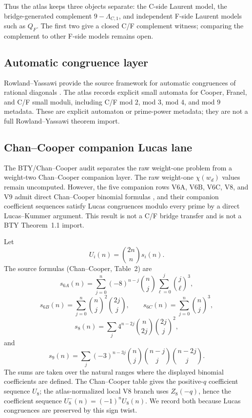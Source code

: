 \documentclass[11pt,a4paper]{article}
\begin{document}
Thus the atlas keeps three objects separate: the C-side Laurent model, the
bridge-generated complement $9-\Lambda_{C,1}$, and independent F-side Laurent
models such as $Q_F$.  The first two give a closed C/F complement
witness; comparing the complement to other F-side models remains open.

\subsection{Automatic congruence layer}

Rowland--Yassawi provide the source framework for automatic congruences of
rational diagonals \cite{rowland_yassawi_2015_automatic_congruences}.  The
atlas records explicit small automata for Cooper, Franel, and C/F small
moduli, including C/F mod $2$, mod $3$, mod $4$, and mod $9$ metadata.  These
are explicit automaton or prime-power metadata; they are not a full
Rowland--Yassawi theorem import.

\subsection{Chan--Cooper companion Lucas lane}

The BTY/Chan--Cooper audit separates the raw weight-one problem from a
weight-two Chan--Cooper companion layer.  The raw weight-one
$\chi(w_d)$ values remain uncomputed.  However, the five companion rows
\(\mathrm{V6A}\), \(\mathrm{V6B}\), \(\mathrm{V6C}\), \(\mathrm{V8}\), and \(\mathrm{V9}\) admit direct Chan--Cooper binomial formulas
\cite{chan_cooper_2012_rational_analogues}, and their companion coefficient
sequences satisfy Lucas congruences modulo every prime by a direct
Lucas--Kummer argument.  This result is not a C/F bridge transfer and is not
a BTY Theorem~1.1 import.

Let
\[
  U_i(n)=\binom{2n}{n}s_i(n).
\]
The source formulas (Chan--Cooper, Table~2) are
\[
  s_{6A}(n)=\sum_{j=0}^n(-8)^{n-j}\binom{n}{j}
          \sum_{\ell=0}^j\binom{j}{\ell}^3,
\]
\[
  s_{6B}(n)=\sum_{j=0}^n\binom{n}{j}^2\binom{2j}{j},
  \qquad
  s_{6C}(n)=\sum_{j=0}^n\binom{n}{j}^3,
\]
\[
  s_8(n)=\sum_j4^{n-2j}\binom{n}{2j}\binom{2j}{j}^2,
\]
and
\[
  s_9(n)=\sum_j(-3)^{n-3j}
  \binom{n}{j}\binom{n-j}{j}\binom{n-2j}{j}.
\]
The sums are taken over the natural ranges where the displayed binomial
coefficients are defined.  The Chan--Cooper table gives the positive-$q$
coefficient sequence $U_8$; the atlas-normalized local \(\mathrm{V8}\)
branch uses $Z_8(-q)$, hence the coefficient sequence
$U_8^-(n)=(-1)^nU_8(n)$.  We record both because Lucas congruences are
preserved by this sign twist.
\end{document}
